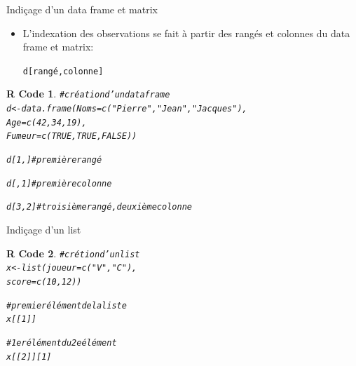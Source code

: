 \documentclass[11pt]{beamer}\usepackage[]{graphicx}\usepackage[]{color}
\makeatletter
\newcommand{\hlnum}[1]{\textcolor[rgb]{0.063,0.58,0.627}{#1}}%
\newcommand{\hlstr}[1]{\textcolor[rgb]{0.063,0.58,0.627}{#1}}%
\newcommand{\hlcom}[1]{\textcolor[rgb]{0.588,0.588,0.588}{#1}}%
\newcommand{\hlstd}[1]{\textcolor[rgb]{0.196,0.196,0.196}{#1}}%
\newcommand{\hlkwb}[1]{\textcolor[rgb]{0.627,0,0.314}{#1}}%
\newcommand{\hlkwc}[1]{\textcolor[rgb]{0,0.631,0.314}{#1}}%
\newcommand{\hlkwd}[1]{\textcolor[rgb]{0.78,0.227,0.412}{#1}}%
\newenvironment{kframe}{%
 \def\at@end@of@kframe{}%
 \ifinner\ifhmode%
  \def\at@end@of@kframe{\end{minipage}}%
  \begin{minipage}{\columnwidth}%
 \fi\fi%
 \def\FrameCommand##1{\hskip\@totalleftmargin \hskip-\fboxsep
 \colorbox{shadecolor}{##1}\hskip-\fboxsep
     \hskip-\linewidth \hskip-\@totalleftmargin \hskip\columnwidth}%
 \MakeFramed {\advance\hsize-\width
   \@totalleftmargin\z@ \linewidth\hsize
   \@setminipage}}%
 {\par\unskip\endMakeFramed%
 \at@end@of@kframe}
\newenvironment{knitrout}{}{} %
\newtheorem{rcode}{R Code}[section]
\newcommand{\code}[1]{\texttt{#1}}
\makeatother
\begin{document}
\begin{frame}[fragile]{Indi\c{c}age d'un data frame et matrix}

\begin{itemize}
  \setlength\itemsep{2em}
\item L'indexation des observations se fait à partir des rangés et colonnes du data frame et matrix:
\begin{center}
\code{d[rangé,colonne]}
\end{center}

\end{itemize}

\begin{knitrout}
\color{fgcolor}\begin{kframe}
\begin{rcode}\begin{alltt}
\hlcom{# création d'un data frame}
\hlstd{d} \hlkwb{<-} \hlkwd{data.frame}\hlstd{(}\hlkwc{Noms} \hlstd{=} \hlkwd{c}\hlstd{(}\hlstr{"Pierre"}\hlstd{,} \hlstr{"Jean"}\hlstd{,} \hlstr{"Jacques"}\hlstd{),}
\hlkwc{Age} \hlstd{=} \hlkwd{c}\hlstd{(}\hlnum{42}\hlstd{,} \hlnum{34}\hlstd{,} \hlnum{19}\hlstd{),}
\hlkwc{Fumeur} \hlstd{=} \hlkwd{c}\hlstd{(}\hlnum{TRUE}\hlstd{,} \hlnum{TRUE}\hlstd{,} \hlnum{FALSE}\hlstd{))}

\hlstd{d[}\hlnum{1}\hlstd{, ]} \hlcom{# première rangé}

\hlstd{d[ ,}\hlnum{1}\hlstd{]} \hlcom{# première colonne }

\hlstd{d[}\hlnum{3}\hlstd{,}\hlnum{2}\hlstd{]} \hlcom{# troisième rangé, deuxième colonne}
\end{alltt}
\end{rcode}\end{kframe}
\end{knitrout}
\end{frame}




\begin{frame}[fragile]{Indi\c{c}age d'un list}

\begin{knitrout}
\color{fgcolor}\begin{kframe}
\begin{rcode}\begin{alltt}
\hlcom{# crétion d'un list}
\hlstd{x} \hlkwb{<-} \hlkwd{list}\hlstd{(}\hlkwc{joueur} \hlstd{=} \hlkwd{c}\hlstd{(}\hlstr{"V"}\hlstd{,} \hlstr{"C"}\hlstd{),}
                  \hlkwc{score} \hlstd{=} \hlkwd{c}\hlstd{(}\hlnum{10}\hlstd{,} \hlnum{12}\hlstd{))}

\hlcom{# premier élément de la liste}
\hlstd{x[[}\hlnum{1}\hlstd{]]}

\hlcom{# 1er élément du 2e élément}
\hlstd{x[[}\hlnum{2}\hlstd{]][}\hlnum{1}\hlstd{]}
\end{alltt}
\end{rcode}\end{kframe}
\end{knitrout}
\end{frame}
\end{document}

